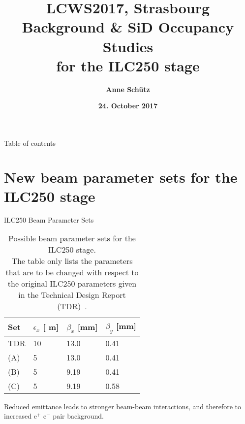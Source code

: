 \documentclass[xcolor={dvipsnames}]{beamer}
\title[ILC250 backgrounds \& SiD Occupancy]{\textbf{\alert{LCWS2017, Strasbourg} \\ \vspace*{0.5cm}  Background \& SiD Occupancy Studies\\for the ILC250 stage}}
\author{\textbf{Anne Sch\"utz}}
\institute{\textbf{DESY}}
\date{\textbf{24. October 2017}}
\newcommand{\electron}{e$^-$\xspace}
\newcommand{\positron}{e$^+$\xspace}
\newcommand{\murm}{%
  \ifmmode
    \mathchoice
        {\hbox{\normalsize\textmu}}
        {\hbox{\normalsize\textmu}}
        {\hbox{\scriptsize\textmu}}
        {\hbox{\tiny\textmu}}%
  \else
    \textmu
  \fi
}
\begin{document}
{
\begin{frame}
  \titlepage
\end{frame}
}
\setcounter{tocdepth}{2}
\begin{frame}{Table of contents}
  \tableofcontents
\end{frame}


\setcounter{tocdepth}{3}




\section{New beam parameter sets for the ILC250 stage}

\begin{frame}{ILC250 Beam Parameter Sets}
 \begin{table}
\caption{Possible beam parameter sets for the ILC250 stage.\\{\small The table only lists the parameters that are to be changed with respect to the original ILC250 parameters given in the Technical Design Report (TDR)~\cite[p. 11]{TDR1}.}}
\label{tab:Parameters}
\centering
\begin{tabularx}{0.55\textwidth}{llll}
\hline\hline
\textbf{Set}  & \textbf{$\epsilon_x$ [\murm m]} & \textbf{$\beta_x$ [mm]} & \textbf{$\beta_y$ [mm]}\\
\hline
\cline{1-4}
\hline
 TDR & 10 & 13.0 & 0.41\\
 (A) & 5 & 13.0 & 0.41\\
 (B) & 5 & 9.19 & 0.41\\
 (C) & 5 & 9.19 & 0.58\\
\hline\hline
\end{tabularx}
\end{table}
\alert{Reduced emittance leads to stronger beam-beam interactions, and therefore to increased \positron \electron pair background.}
\end{frame}
\end{document}
